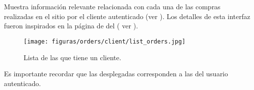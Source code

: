 \section{\ordersEF}\label{chapter:solucionimplementada:section:orders}
Muestra información relevante relacionada con cada una de las compras realizadas en el sitio por el cliente autenticado (ver ). Los detalles de esta interfaz fueron inspirados en la página de \ordersEF del \websiteINT \dealextremeNAME ( ver ).  


\begin{figure}[H]
	\centering
	\texttt{[image: figuras/orders/client/list\_orders.jpg]}
	\caption{Lista de las \ordersEF que tiene un cliente.}
	\label{figure:orders:client:list_orders}
\end{figure}

Es importante recordar que las \ordersEF desplegadas corresponden a las del usuario autenticado.